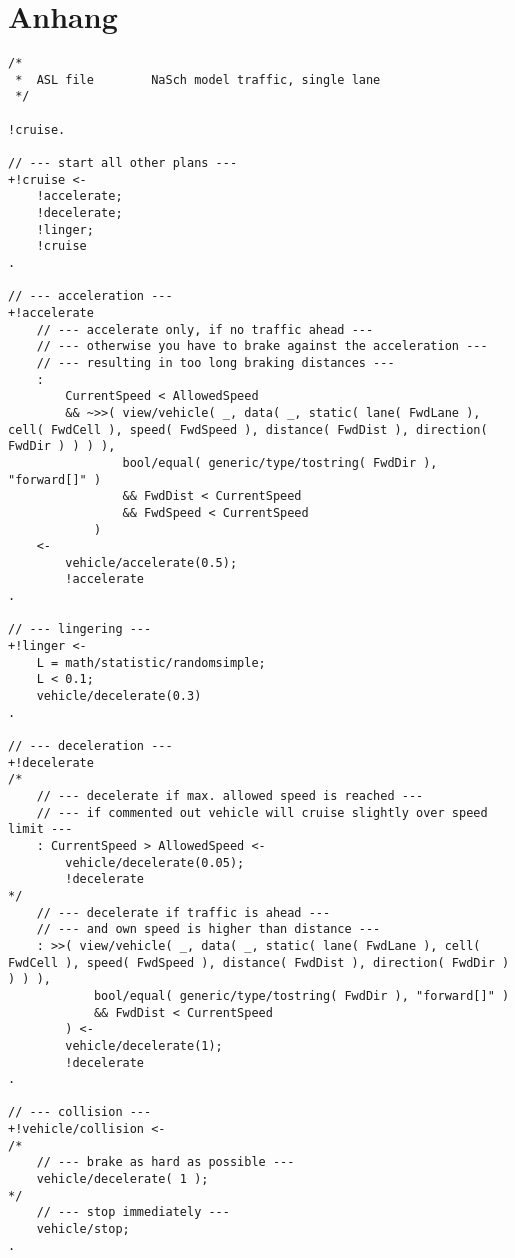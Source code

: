 \section{Anhang}


\newpage


\begin{lstlisting}[style=asl, 
                   keywords={+!cruise,+!accelerate,+!linger,+!decelerate,+!vehicle/collision}, 
                   keywords={[2]}, 
                   keywords={[3]}, 
                   caption={Agentenscript: NaSch-Modell, einspurig},
                   label={lst:nasch}]      
/*
 *  ASL file        NaSch model traffic, single lane
 */

!cruise.

// --- start all other plans ---
+!cruise <-
    !accelerate;
    !decelerate;
    !linger;
    !cruise
.

// --- acceleration ---
+!accelerate
    // --- accelerate only, if no traffic ahead ---
    // --- otherwise you have to brake against the acceleration ---
    // --- resulting in too long braking distances ---
    : 
        CurrentSpeed < AllowedSpeed
        && ~>>( view/vehicle( _, data( _, static( lane( FwdLane ), cell( FwdCell ), speed( FwdSpeed ), distance( FwdDist ), direction( FwdDir ) ) ) ),
                bool/equal( generic/type/tostring( FwdDir ), "forward[]" )
                && FwdDist < CurrentSpeed
                && FwdSpeed < CurrentSpeed
            )
    <-
        vehicle/accelerate(0.5);
        !accelerate
.

// --- lingering ---
+!linger <-
    L = math/statistic/randomsimple;
    L < 0.1;
    vehicle/decelerate(0.3)
.

// --- deceleration ---
+!decelerate 
/*
    // --- decelerate if max. allowed speed is reached ---
    // --- if commented out vehicle will cruise slightly over speed limit ---
    : CurrentSpeed > AllowedSpeed <-
        vehicle/decelerate(0.05);
        !decelerate
*/
    // --- decelerate if traffic is ahead ---
    // --- and own speed is higher than distance ---
    : >>( view/vehicle( _, data( _, static( lane( FwdLane ), cell( FwdCell ), speed( FwdSpeed ), distance( FwdDist ), direction( FwdDir ) ) ) ), 
            bool/equal( generic/type/tostring( FwdDir ), "forward[]" ) 
            && FwdDist < CurrentSpeed
        ) <-
        vehicle/decelerate(1);
        !decelerate
.

// --- collision ---
+!vehicle/collision <-
/*
    // --- brake as hard as possible ---
    vehicle/decelerate( 1 );
*/
    // --- stop immediately ---
    vehicle/stop;
.\end{lstlisting}



